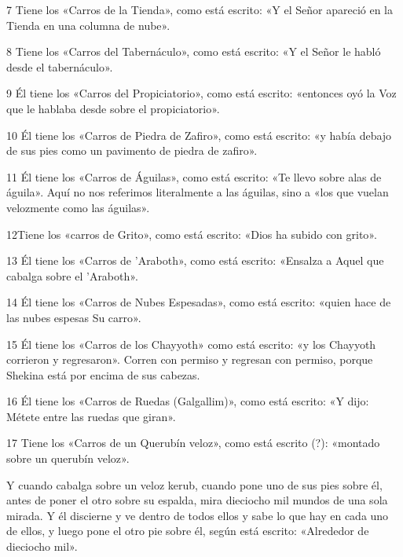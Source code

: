 \par 7 Tiene los «Carros de la Tienda», como está escrito: «Y el Señor apareció en la Tienda en una columna de nube».

\par 8 Tiene los «Carros del Tabernáculo», como está escrito: «Y el Señor le habló desde el tabernáculo».

\par 9 Él tiene los «Carros del Propiciatorio», como está escrito: «entonces oyó la Voz que le hablaba desde sobre el propiciatorio».

\par 10 Él tiene los «Carros de Piedra de Zafiro», como está escrito: «y había debajo de sus pies como un pavimento de piedra de zafiro».

\par 11 Él tiene los «Carros de Águilas», como está escrito: «Te llevo sobre alas de águila». Aquí no nos referimos literalmente a las águilas, sino a «los que vuelan velozmente como las águilas».

\par 12Tiene los «carros de Grito», como está escrito: «Dios ha subido con grito».

\par 13 Él tiene los «Carros de 'Araboth», como está escrito: «Ensalza a Aquel que cabalga sobre el 'Araboth».

\par 14 Él tiene los «Carros de Nubes Espesadas», como está escrito: «quien hace de las nubes espesas Su carro».

\par 15 Él tiene los «Carros de los Chayyoth» como está escrito: «y los Chayyoth corrieron y regresaron». Corren con permiso y regresan con permiso, porque Shekina está por encima de sus cabezas.

\par 16 Él tiene los «Carros de Ruedas (Galgallim)», como está escrito: «Y dijo: Métete entre las ruedas que giran».

\par 17 Tiene los «Carros de un Querubín veloz», como está escrito (?): «montado sobre un querubín veloz».

Y cuando cabalga sobre un veloz kerub, cuando pone uno de sus pies sobre él, antes de poner el otro sobre su espalda, mira dieciocho mil mundos de una sola mirada. Y él discierne y ve dentro de todos ellos y sabe lo que hay en cada uno de ellos, y luego pone el otro pie sobre él, según está escrito: «Alrededor de dieciocho mil».

